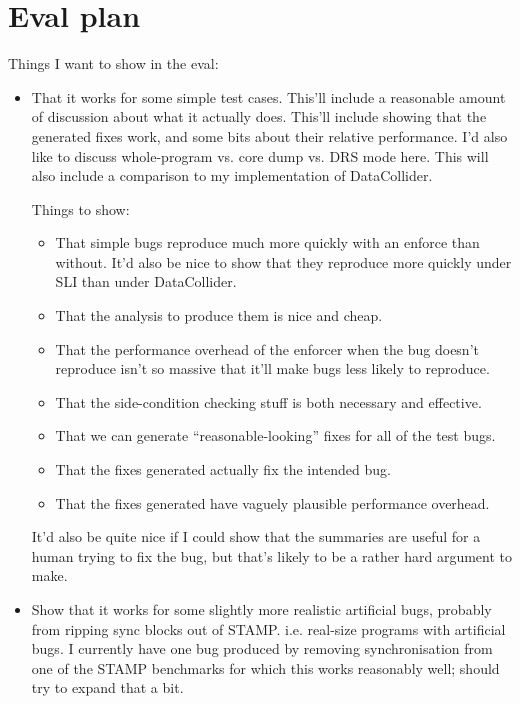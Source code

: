 \section{Eval plan}

Things I want to show in the eval:

\begin{itemize}
\item That it works for some simple test cases.  This'll include a
  reasonable amount of discussion about what it actually does.
  This'll include showing that the generated fixes work, and some bits
  about their relative performance.  I'd also like to discuss
  whole-program vs. core dump vs. DRS mode here.  This will also
  include a comparison to my implementation of DataCollider.

  Things to show:

  \begin{itemize}
  \item That simple bugs reproduce much more quickly with an enforce
    than without.  It'd also be nice to show that they reproduce more
    quickly under SLI than under DataCollider.
  \item That the analysis to produce them is nice and cheap.
  \item That the performance overhead of the enforcer when the bug
    doesn't reproduce isn't so massive that it'll make bugs less
    likely to reproduce.
  \item That the side-condition checking stuff is both necessary and
    effective.
  \item That we can generate ``reasonable-looking'' fixes for all of
    the test bugs.
  \item That the fixes generated actually fix the intended bug.
  \item That the fixes generated have vaguely plausible performance
    overhead.
  \end{itemize}

  It'd also be quite nice if I could show that the summaries are
  useful for a human trying to fix the bug, but that's likely to be a
  rather hard argument to make.

\item Show that it works for some slightly more realistic artificial
  bugs, probably from ripping sync blocks out of STAMP.
  i.e. real-size programs with artificial bugs.  I currently have one
  bug produced by removing synchronisation from one of the STAMP
  benchmarks for which this works reasonably well; should try to
  expand that a bit.


\end{itemize}
